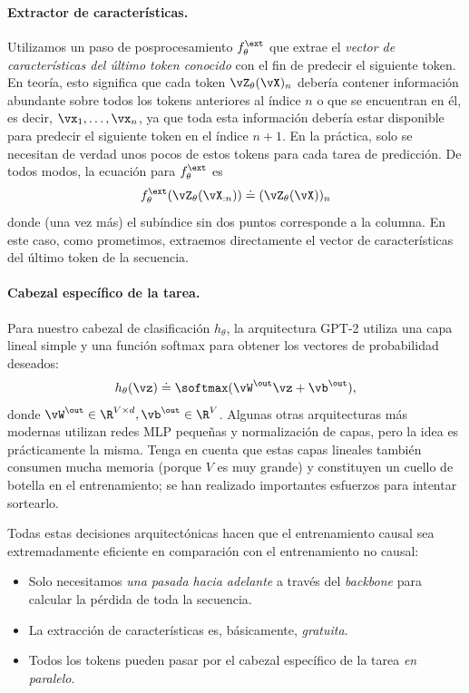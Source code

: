 \documentclass[../../book-main_es.tex]{subfiles}
\begin{document}
\paragraph{Extractor de características.} Utilizamos un paso de posprocesamiento
\(f_{\theta}^{\ext}\) que extrae el \textit{vector de características del
último token conocido} con el fin de predecir el siguiente token. En teoría,
esto significa que cada token \(\vZ_{\theta}(\vX)_{n}\) debería contener
información abundante sobre todos los tokens anteriores al índice \(n\) o que se encuentran en él,
es decir, \(\vx_{1}, \dots, \vx_{n}\), ya que toda esta información debería
estar disponible para predecir el siguiente token en el índice \(n + 1\). En
la práctica, solo se necesitan de verdad unos pocos de estos tokens para cada
tarea de predicción. De todos modos, la ecuación para \(f_{\theta}^{\ext}\) es
\begin{equation}
f_{\theta}^{\ext}(\vZ_{\theta}(\vX_{:n})) \doteq (\vZ_{\theta}(\vX))_{n}
\end{equation}
donde (una vez más) el subíndice sin dos puntos corresponde a la columna. En este caso, como
prometimos, extraemos directamente el vector de características del último
token de la secuencia.

\paragraph{Cabezal específico de la tarea.} Para nuestro cabezal de clasificación
\(h_{\theta}\), la arquitectura GPT-2 utiliza una capa lineal simple y
una función softmax para obtener los vectores de probabilidad deseados:
\begin{equation}
h_{\theta}(\vz) \doteq \softmax(\vW^{\out}\vz + \vb^{\out}),
\end{equation}
donde \(\vW^{\out} \in \R^{V \times d}, \vb^{\out} \in \R^{V}\). Algunas
otras arquitecturas más modernas utilizan redes MLP pequeñas y
normalización de capas, pero la idea es prácticamente la misma. Tenga en cuenta que estas
capas lineales también consumen mucha memoria (porque \(V\) es muy
grande) y constituyen un cuello de botella en el entrenamiento; se han realizado importantes
esfuerzos para intentar sortearlo.

Todas estas decisiones arquitectónicas hacen que el entrenamiento causal sea
extremadamente eficiente en comparación con el entrenamiento no causal:
\begin{itemize}
\item Solo necesitamos \textit{una pasada hacia adelante} a través del \textit{backbone} para
    calcular la pérdida de toda la secuencia.
\item La extracción de características es, básicamente, \textit{gratuita}.
\item Todos los tokens pueden pasar por el cabezal específico de la tarea
    \textit{en paralelo}.
\end{itemize}
\end{document}

